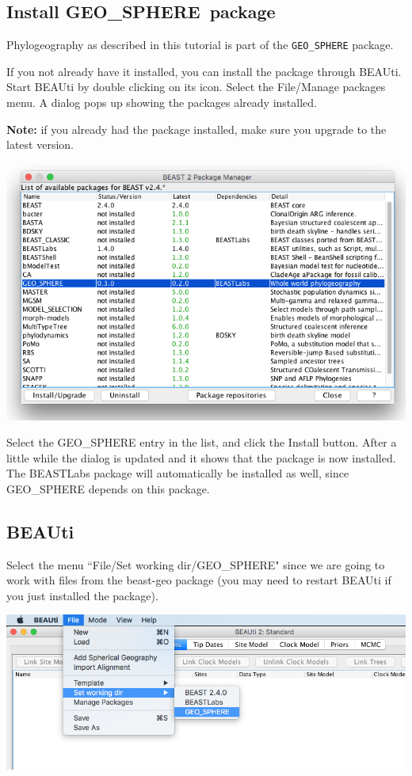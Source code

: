 \documentclass{article}
\def\beast-geo{GEO\_SPHERE}
\begin{document}
\subsection*{Install \beast-geo\ package}

Phylogeography as described in this tutorial is part of the {\tt \beast-geo} package.

If you not already have it installed, you can install the package through BEAUti. Start BEAUti by double clicking on its icon. 
Select the File/Manage packages menu. A dialog pops up showing the packages already installed. 

{\bf Note:} if you already had the package installed, make sure you upgrade to the latest version.

\begin{center}
\includegraphics[scale=0.4]{figures/addonmgr.png}
\end{center}

Select the \beast-geo{} entry in the list, and click the Install button. After a little while the dialog is updated and it shows that the package is now installed. The BEASTLabs package will automatically be installed as well, since \beast-geo{} depends on this package.

\subsection*{BEAUti}

Select the menu ``File/Set working dir/\beast-geo" since we are going to work with files from the beast-geo package (you may need to restart BEAUti if you just installed the package).

\begin{center}
\includegraphics[scale=0.4]{figures/BEAUti_setWD}
\end{center}
\end{document}
